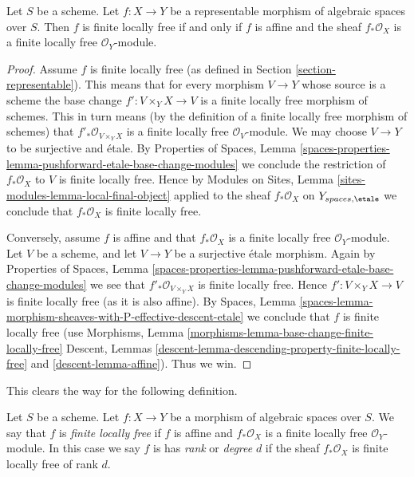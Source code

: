 \begin{lemma}
\label{lemma-finite-locally-free-representable}
Let $S$ be a scheme. Let $f : X \to Y$ be a representable
morphism of algebraic spaces over $S$. Then
$f$ is finite locally free if and only if $f$ is affine and
the sheaf $f_*\mathcal{O}_X$ is a finite locally free
$\mathcal{O}_Y$-module.
\end{lemma}

\begin{proof}
Assume $f$ is finite locally free (as defined in
Section \ref{section-representable}). This means that
for every morphism $V \to Y$ whose source is a scheme the
base change $f' : V \times_Y X \to V$ is a finite locally free morphism
of schemes. This in turn means (by the definition of a finite locally
free morphism of schemes) that
$f'_*\mathcal{O}_{V \times_Y X}$
is a finite locally free $\mathcal{O}_V$-module. We may choose $V \to Y$
to be surjective and \'etale. By
Properties of Spaces,
Lemma \ref{spaces-properties-lemma-pushforward-etale-base-change-modules}
we conclude the restriction of $f_*\mathcal{O}_X$ to $V$ is
finite locally free. Hence by
Modules on Sites, Lemma \ref{sites-modules-lemma-local-final-object}
applied to the sheaf $f_*\mathcal{O}_X$ on $Y_{spaces, \etale}$
we conclude that $f_*\mathcal{O}_X$ is finite locally free.

\medskip\noindent
Conversely, assume $f$ is affine and that $f_*\mathcal{O}_X$ is a finite
locally free $\mathcal{O}_Y$-module. Let $V$ be a scheme, and let
$V \to Y$ be a surjective \'etale morphism. Again by
Properties of Spaces,
Lemma \ref{spaces-properties-lemma-pushforward-etale-base-change-modules}
we see that $f'_*\mathcal{O}_{V \times_Y X}$ is finite locally free.
Hence $f' : V \times_Y X \to V$ is finite locally free (as it is also affine).
By
Spaces,
Lemma \ref{spaces-lemma-morphism-sheaves-with-P-effective-descent-etale}
we conclude that $f$ is finite locally free (use
Morphisms, Lemma \ref{morphisms-lemma-base-change-finite-locally-free}
Descent, Lemmas \ref{descent-lemma-descending-property-finite-locally-free}
and \ref{descent-lemma-affine}). Thus we win.
\end{proof}

\noindent
This clears the way for the following definition.

\begin{definition}
\label{definition-finite-locally-free}
Let $S$ be a scheme.
Let $f : X \to Y$ be a morphism of algebraic spaces over $S$.
We say that $f$ is {\it finite locally free} if $f$ is affine
and $f_*\mathcal{O}_X$ is a finite locally free $\mathcal{O}_Y$-module.
In this case we say $f$ is
has {\it rank} or {\it degree} $d$
if the sheaf $f_*\mathcal{O}_X$ is finite locally free of rank $d$.
\end{definition}

